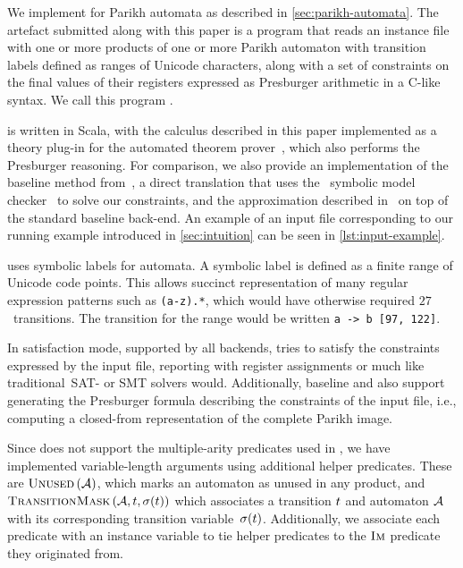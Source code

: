 
We implement \Calculus{} for Parikh automata as described in
\cref{sec:parikh-automata}. The artefact submitted along with this paper is a
program that reads an instance file with one or more products of one or more
Parikh automaton with transition labels defined as ranges of Unicode characters,
along with a set of constraints on the final values of their registers expressed
as Presburger arithmetic in a C-like syntax. We call this program
\Catra.

\Catra{} is written in Scala, with the calculus described in this paper
implemented as a theory plug-in for the \Princess{} automated theorem
prover~\cite{princess}, which also performs the Presburger reasoning. For
comparison, we also provide an implementation of the baseline method
from~\cite{generate-parikh-image}, a direct translation that uses the~\Nuxmv{}
symbolic model checker~\cite{nuxmv} to solve our constraints, and the
approximation described in~\cite{approximate-parikh} on top of the standard
baseline back-end. An example of an input file corresponding to our running
example introduced in \cref{sec:intuition} can be seen in
\cref{lst:input-example}.

\Catra{} uses symbolic labels for automata. A symbolic label is defined as a
finite range of Unicode code points. This allows succinct representation of many
regular expression patterns such as \lstinline{(a-z).*}, which would have
otherwise required $27$~transitions. The transition for the range would be
written \lstinline{a -> b [97, 122]}.

In satisfaction mode, supported by all backends, \Catra{} tries to satisfy the
constraints expressed by the input file, reporting \Sat{} with register
assignments or \Unsat{} much like traditional~SAT- or SMT solvers would.
Additionally, baseline and \Calculus{} also support generating the Presburger
formula describing the constraints of the input file, i.e., computing
a closed-from representation of the complete Parikh image.

Since \Princess{} does not support the multiple-arity predicates used
in \Calculus{}, we have implemented variable-length arguments using
additional helper predicates. These are $\operatorname{\textsc{Unused}}{}(\mathcal{A})$, which
marks an automaton as unused in any product, and
$\operatorname{\textsc{TransitionMask}}{}(\mathcal{A}, t, \operatorname{\sigma}(t))$
which associates a transition $t$ and automaton $\mathcal{A}$
with its corresponding transition
variable~$\operatorname{\sigma}(t)$. Additionally, we associate each
predicate with an instance variable to tie helper predicates to the
$\operatorname{\textsc{Im}}$ predicate they originated from.

